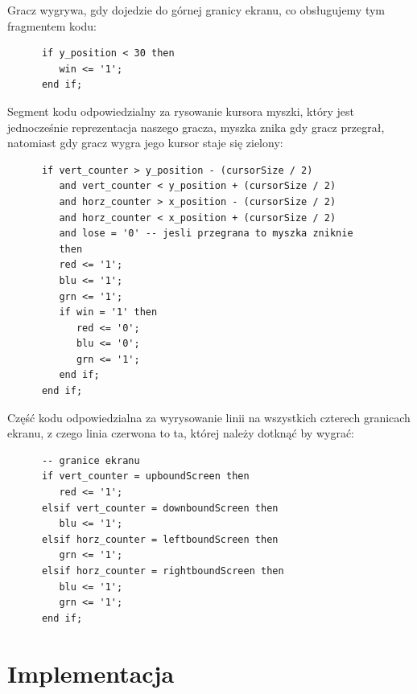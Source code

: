 \documentclass[a4paper]{article}
\begin{document}
Gracz wygrywa, gdy dojedzie do górnej granicy ekranu, co obsługujemy tym fragmentem kodu:
\begin{verbatim}
      if y_position < 30 then
         win <= '1';
      end if;
\end{verbatim}


Segment kodu odpowiedzialny za rysowanie kursora myszki, który jest jednocześnie reprezentacja naszego gracza, myszka znika gdy gracz przegrał, natomiast gdy gracz wygra jego kursor staje się zielony:
\begin{verbatim}
      if vert_counter > y_position - (cursorSize / 2) 
         and vert_counter < y_position + (cursorSize / 2)
         and horz_counter > x_position - (cursorSize / 2)
         and horz_counter < x_position + (cursorSize / 2)
         and lose = '0' -- jesli przegrana to myszka zniknie
         then
         red <= '1';
         blu <= '1';
         grn <= '1';
         if win = '1' then 
            red <= '0';
            blu <= '0';
            grn <= '1';
         end if;
      end if;  
\end{verbatim}



Część kodu odpowiedzialna za wyrysowanie linii na wszystkich czterech granicach ekranu, z czego linia czerwona to ta, której należy dotknąć by wygrać:
\begin{verbatim}
      -- granice ekranu
      if vert_counter = upboundScreen then
         red <= '1';
      elsif vert_counter = downboundScreen then
         blu <= '1';
      elsif horz_counter = leftboundScreen then
         grn <= '1';
      elsif horz_counter = rightboundScreen then
         blu <= '1';
         grn <= '1';
      end if;
\end{verbatim}


\newpage

\section{Implementacja}
\end{document}
